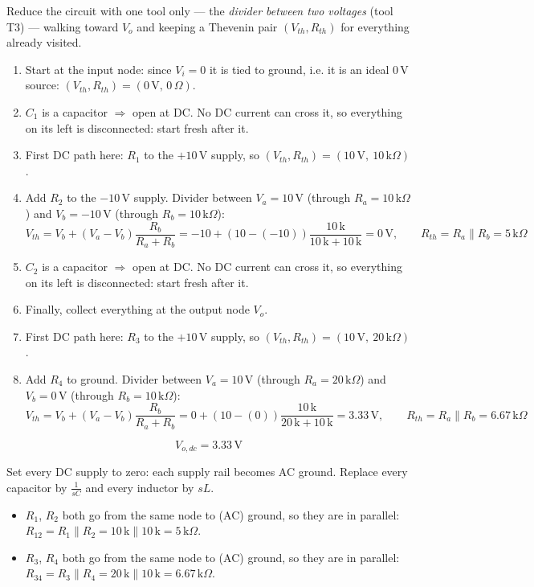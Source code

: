 \documentclass[11pt]{article}
\newcommand{\solstep}[2]{\par\medskip{\color{stepc}\textbf{Step #1 --- #2}}\par\nopagebreak}
\begin{document}
Reduce the circuit with one tool only --- the \emph{divider between two voltages} (tool T3) --- walking toward $V_o$ and keeping a Thevenin pair $(V_{th},R_{th})$ for everything already visited.
\begin{enumerate}[leftmargin=*,itemsep=2pt]
\item Start at the input node: since $V_i=0$ it is tied to ground, i.e. it is an ideal $0\,\mathrm{V}$ source: $(V_{th},R_{th})=(0\,\mathrm{V},\,0\,\Omega)$.
\item $C_{1}$ is a capacitor $\Rightarrow$ open at DC. No DC current can cross it, so everything on its left is disconnected: start fresh after it.
\item First DC path here: $R_{1}$ to the $+10\,\mathrm{V}$ supply, so $(V_{th},R_{th}) = (10\,\mathrm{V},\ 10\,\mathrm{k}\Omega)$.
\item Add $R_{2}$ to the $-10\,\mathrm{V}$ supply. Divider between $V_a=10\,\mathrm{V}$ (through $R_a=10\,\mathrm{k}\Omega$) and $V_b=-10\,\mathrm{V}$ (through $R_b=10\,\mathrm{k}\Omega$):\[
V_{th} = V_b + (V_a-V_b)\frac{R_b}{R_a+R_b} = -10 + \left(10 - (-10)\right)\frac{10\,\mathrm{k}}{10\,\mathrm{k} + 10\,\mathrm{k}} = 0\,\mathrm{V},\qquad R_{th} = R_a\parallel R_b = 5\,\mathrm{k}\Omega
\]

\item $C_{2}$ is a capacitor $\Rightarrow$ open at DC. No DC current can cross it, so everything on its left is disconnected: start fresh after it.
\item Finally, collect everything at the output node $V_o$.
\item First DC path here: $R_{3}$ to the $+10\,\mathrm{V}$ supply, so $(V_{th},R_{th}) = (10\,\mathrm{V},\ 20\,\mathrm{k}\Omega)$.
\item Add $R_{4}$ to ground. Divider between $V_a=10\,\mathrm{V}$ (through $R_a=20\,\mathrm{k}\Omega$) and $V_b=0\,\mathrm{V}$ (through $R_b=10\,\mathrm{k}\Omega$):\[
V_{th} = V_b + (V_a-V_b)\frac{R_b}{R_a+R_b} = 0 + \left(10 - (0)\right)\frac{10\,\mathrm{k}}{20\,\mathrm{k} + 10\,\mathrm{k}} = 3.33\,\mathrm{V},\qquad R_{th} = R_a\parallel R_b = 6.67\,\mathrm{k}\Omega
\]

\end{enumerate}

\[
\boxed{V_{o,dc} = 3.33\,\mathrm{V}}
\]

\solstep{3}{AC circuit}Set every DC supply to zero: each supply rail becomes AC ground. Replace every capacitor by $\frac{1}{sC}$ and every inductor by $sL$.
\begin{itemize}[leftmargin=*,itemsep=2pt]
\item $R_{1}$, $R_{2}$ both go from the same node to (AC) ground, so they are in parallel: $R_{12} = R_{1} \parallel R_{2} = 10\,\mathrm{k} \parallel 10\,\mathrm{k} = 5\,\mathrm{k}\Omega$.
\item $R_{3}$, $R_{4}$ both go from the same node to (AC) ground, so they are in parallel: $R_{34} = R_{3} \parallel R_{4} = 20\,\mathrm{k} \parallel 10\,\mathrm{k} = 6.67\,\mathrm{k}\Omega$.
\end{itemize}
\end{document}
